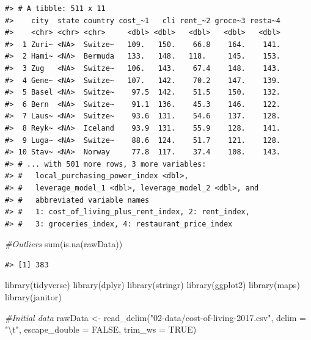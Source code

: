 \documentclass[
  11pt,
  a4paper,
  twoside]{scrbook}
\newenvironment{Shaded}{\begin{snugshade}}{\end{snugshade}}
\newcommand{\AttributeTok}[1]{\textcolor[rgb]{0.77,0.63,0.00}{#1}}
\newcommand{\CommentTok}[1]{\textcolor[rgb]{0.56,0.35,0.01}{\textit{#1}}}
\newcommand{\ConstantTok}[1]{\textcolor[rgb]{0.00,0.00,0.00}{#1}}
\newcommand{\FunctionTok}[1]{\textcolor[rgb]{0.00,0.00,0.00}{#1}}
\newcommand{\NormalTok}[1]{#1}
\newcommand{\OtherTok}[1]{\textcolor[rgb]{0.56,0.35,0.01}{#1}}
\newcommand{\SpecialCharTok}[1]{\textcolor[rgb]{0.00,0.00,0.00}{#1}}
\newcommand{\StringTok}[1]{\textcolor[rgb]{0.31,0.60,0.02}{#1}}
\begin{document}
\begin{verbatim}
#> # A tibble: 511 x 11
#>    city  state country cost_~1   cli rent_~2 groce~3 resta~4
#>    <chr> <chr> <chr>     <dbl> <dbl>   <dbl>   <dbl>   <dbl>
#>  1 Zuri~ <NA>  Switze~   109.   150.    66.8    164.    141.
#>  2 Hami~ <NA>  Bermuda   133.   148.   118.     145.    153.
#>  3 Zug   <NA>  Switze~   106.   143.    67.4    148.    143.
#>  4 Gene~ <NA>  Switze~   107.   142.    70.2    147.    139.
#>  5 Basel <NA>  Switze~    97.5  142.    51.5    150.    132.
#>  6 Bern  <NA>  Switze~    91.1  136.    45.3    146.    122.
#>  7 Laus~ <NA>  Switze~    93.6  131.    54.6    137.    128.
#>  8 Reyk~ <NA>  Iceland    93.9  131.    55.9    128.    141.
#>  9 Luga~ <NA>  Switze~    88.6  124.    51.7    121.    128.
#> 10 Stav~ <NA>  Norway     77.8  117.    37.4    108.    143.
#> # ... with 501 more rows, 3 more variables:
#> #   local_purchasing_power_index <dbl>,
#> #   leverage_model_1 <dbl>, leverage_model_2 <dbl>, and
#> #   abbreviated variable names
#> #   1: cost_of_living_plus_rent_index, 2: rent_index,
#> #   3: groceries_index, 4: restaurant_price_index
\end{verbatim}

\linespread{1}

\begin{Shaded}
\begin{Highlighting}[]

\CommentTok{\#Outliers}
\FunctionTok{sum}\NormalTok{(}\FunctionTok{is.na}\NormalTok{(rawData))}
\end{Highlighting}
\end{Shaded}

\linespread{1}

\begin{verbatim}
#> [1] 383
\end{verbatim}

\linespread{1}

\begin{Shaded}
\begin{Highlighting}[]
\FunctionTok{library}\NormalTok{(tidyverse)}
\FunctionTok{library}\NormalTok{(dplyr)}
\FunctionTok{library}\NormalTok{(stringr)}
\FunctionTok{library}\NormalTok{(ggplot2)}
\FunctionTok{library}\NormalTok{(maps)}
\FunctionTok{library}\NormalTok{(janitor)}

\CommentTok{\#Initial data}
\NormalTok{rawData }\OtherTok{\textless{}{-}} \FunctionTok{read\_delim}\NormalTok{(}\StringTok{"02{-}data/cost{-}of{-}living{-}2017.csv"}\NormalTok{, }
                                  \AttributeTok{delim =} \StringTok{"}\SpecialCharTok{\textbackslash{}t}\StringTok{"}\NormalTok{, }\AttributeTok{escape\_double =} \ConstantTok{FALSE}\NormalTok{, }
                                  \AttributeTok{trim\_ws =} \ConstantTok{TRUE}\NormalTok{)}
\end{Highlighting}
\end{Shaded}
\end{document}
